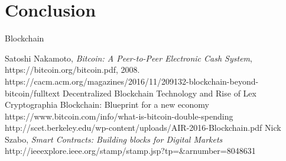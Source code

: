 \documentclass[report]{IEEEtran}
\begin{document}
\section{Conclusion}
Blockchain 


\begin{thebibliography}{1}

Satoshi Nakamoto, \emph{Bitcoin: A Peer-to-Peer Electronic Cash System}, https://bitcoin.org/bitcoin.pdf, 2008.
https://cacm.acm.org/magazines/2016/11/209132-blockchain-beyond-bitcoin/fulltext
Decentralized Blockchain Technology and Rise of Lex Cryptographia
Blockchain: Blueprint for a new economy
https://www.bitcoin.com/info/what-is-bitcoin-double-spending
http://scet.berkeley.edu/wp-content/uploads/AIR-2016-Blockchain.pdf
Nick Szabo, \emph{Smart Contracts: Building blocks for Digital Markets}
http://ieeexplore.ieee.org/stamp/stamp.jsp?tp=&arnumber=8048631
\end{thebibliography}
\end{document}

